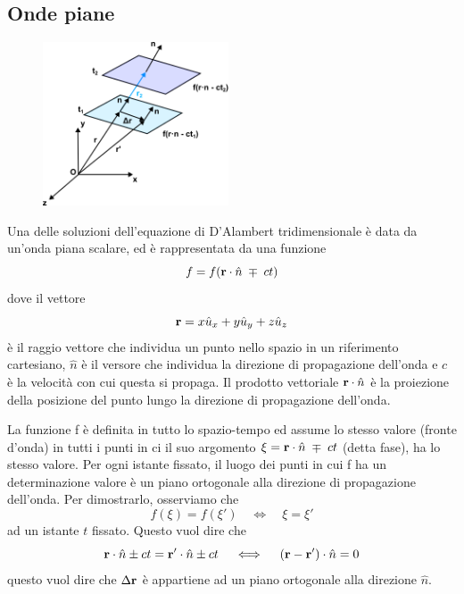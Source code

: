 \subsection{Onde piane}
\begin{figure}  %
  \centering
  \includegraphics[width=0.49\textwidth]{images/planar_wave}
\end{figure}
Una delle soluzioni dell'equazione di D'Alambert tridimensionale \`e data da un'onda piana scalare, ed \`e rappresentata da una funzione
\begin{equation}
	f = f(\bold{r} \cdot \hat{n} \;\mp \; ct)
\end{equation}
dove il vettore
\begin{equation*}
	\bold{r} = x \hat{u}_{x} + y \hat{u}_{y} + z \hat{u}_{z}
\end{equation*}
\`e il raggio vettore che individua un punto nello spazio in un riferimento cartesiano, $\hat{n}$ \`e il versore che individua la direzione di propagazione dell'onda e $c$ \`e la velocit\`a con cui questa si propaga. Il prodotto vettoriale $\bold{r} \cdot \hat{n}$ \`e la proiezione della posizione del punto lungo la direzione di propagazione dell'onda.

La funzione f \`e definita in tutto lo spazio-tempo ed assume lo stesso valore (fronte d'onda) in tutti i punti in ci il suo argomento $\xi = \bold{r} \cdot \hat{n}  \; \mp \; ct$ (detta fase), ha lo stesso valore. Per ogni istante fissato, il luogo dei punti in cui f ha  un determinazione valore \`e un piano ortogonale alla direzione di propagazione dell'onda. Per dimostrarlo, osserviamo che 
\begin{equation*}
	f(\xi) = f(\xi') \quad \iff \quad \xi = \xi'
\end{equation*}
ad un istante $t$ fissato. Questo vuol dire che 
\begin{equation*}
	\bold{r} \cdot \hat{n} \pm ct = \bold{r}' \cdot \hat{n} \pm ct \quad \iff \quad (\bold{r}-\bold{r}') \cdot \hat{n} = 0 
\end{equation*}
questo vuol dire che $\Delta \bold{r}$ \`e appartiene ad un piano ortogonale alla direzione $\hat{n}$. 

